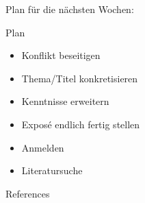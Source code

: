 \documentclass{beamer}
\begin{document}
\begin{frame}{Plan für die nächsten Wochen:}
	\begin{block}{Plan}
		\begin{itemize}
			\item Konflikt beseitigen
			\item Thema/Titel konkretisieren
			\item Kenntnisse erweitern
			\item Exposé endlich fertig stellen
			\item Anmelden
			\item Literatursuche
		\end{itemize}
	\end{block}
\end{frame}

\begin{frame}[shrink=10]{References}
\nocite{*}

 
\end{frame}
\end{document}
